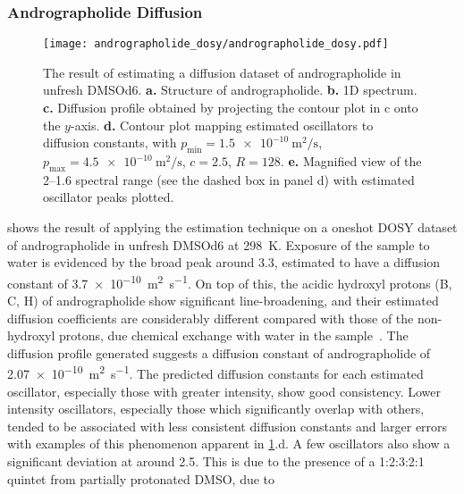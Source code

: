 \subsubsection{Andrographolide Diffusion}
\begin{figure}
    \centering
    \texttt{[image: andrographolide\_dosy/andrographolide\_dosy.pdf]}
    \caption[
        The result of estimating a diffusion dataset of andrographolide.
    ]{
        The result of estimating a diffusion dataset of andrographolide in
        unfresh \acs{DMSOd6}.
        \textbf{a.} Structure of andrographolide.
        \textbf{b.} \ac{1D} spectrum.
        \textbf{c.} Diffusion profile obtained by projecting the contour plot in
        c onto the $y$-axis.
        \textbf{d.} Contour plot mapping estimated oscillators to diffusion constants, with
        $p_{\text{min}} = \qty{1.5e-10}{\meter\squared\per\second}$,
        $p_{\text{max}} = \qty{4.5e-10}{\meter\squared\per\second}$,
        $c = 2.5$,
        $R=128$.
        \textbf{e.} Magnified view of the \SIrange{2}{1.6}{\partspermillion}
        spectral range (see the dashed box in panel d) with estimated
        oscillator peaks plotted.
    }
    \label{fig:andrographolide-dosy}
\end{figure}
 shows the result of applying the
estimation technique on a oneshot \ac{DOSY} dataset of andrographolide in
unfresh \acs{DMSOd6} at \qty{298}{\kelvin}. Exposure of the sample to water is
evidenced by the broad
peak around \qty{3.3}{\partspermillion}, estimated to have a diffusion constant
of \qty{3.7e-10}{\meter\squared\per\second}. On top of this, the acidic
hydroxyl protons (B, C, H) of andrographolide show significant line-broadening,
and their estimated diffusion coefficients are considerably different compared
with those of the non-hydroxyl protons, due chemical exchange with water in the
sample~\cite{Chen1998}.
The diffusion profile generated suggests a diffusion constant of andrographolide of
\qty{2.07e-10}{\meter\squared\per\second}. The predicted diffusion constants for
each estimated oscillator, especially those with greater intensity, show
good consistency.
Lower intensity oscillators, especially those which
significantly overlap with others, tended to be associated with
less consistent diffusion constants and larger errors with examples of this
phenomenon apparent in \cref{fig:andrographolide-dosy}.d. A few
oscillators also show a
significant deviation at around \qty{2.5}{\partspermillion}. This is due to the
presence of a 1:2:3:2:1 quintet from partially protonated \acs{DMSO}, due to

